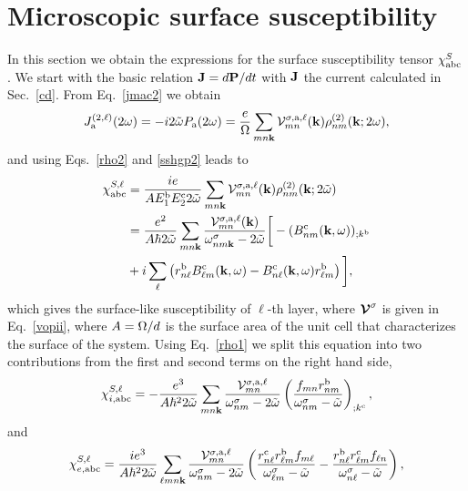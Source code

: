 \documentclass[floatfix,prb,aps,superscriptaddress,11pt,preprint,letterpaper]{revtex4}
\begin{document}


\section{Microscopic surface susceptibility}
In this section we obtain the expressions for the 
surface susceptibility tensor $\chi^S_{\mathrm{a}\mathrm{b}\mathrm{c}}$.
We start with the basic relation $\mathbf{J}=d\mathbf{P}/dt$ 
with $\mathbf{J}$ the current calculated in Sec.~\ref{cd}. From Eq.~\eqref{jmac2} 
we obtain
\begin{equation}\label{Pjikn}
J_{\mathrm{a}}^{(2,\ell)}(2\omega)=-i2\tilde\omega P_{\mathrm{a}}(2\omega)
=\frac{e}{\Omega}
\sum_{mn\mathbf{k}}
{\mathbf{\cal V}}^{\sigma,\mathrm{a},\ell}_{mn}(\mathbf{k})
\rho^{(2)}_{nm}(\mathbf{k};2\omega)
,
\end{equation}
and using Eqs.~\eqref{rho2} and \eqref{sshgp2} leads to
\begin{align}\label{Pjikn2}
\chi^{S,\ell}_{\mathrm{a}\mathrm{b}\mathrm{c}}
&=
\frac{ie}{A E^{\mathrm{b}}_1E^{\mathrm{c}}_2 2\tilde\omega}
\sum_{mn\mathbf{k}}
{\mathbf{\cal V}}^{\sigma,\mathrm{a},\ell}_{mn}(\mathbf{k})
\rho^{(2)}_{nm}(\mathbf{k};2\tilde\omega)
\nonumber \\
&=
\frac{e^2}{A\hbar2\tilde\omega}
\sum_{mn\mathbf{k}}
\frac{{\mathbf{\cal V}}^{\sigma,\mathrm{a},\ell}_{mn}(\mathbf{k})}
{\omega^\sigma_{nm\mathbf{k}}-2\tilde\omega}
\bigg[
-(B_{nm}^{\mathrm{c}}(\mathbf{k},\omega))_{;k^{\mathrm{b}}}
\nonumber \\
&
+i\sum_\ell\left(r_{n\ell}^{\mathrm{b}}B_{\ell m}^{\mathrm{c}}(\mathbf{k},\omega) -
  B_{n\ell}^{\mathrm{c}}(\mathbf{k},\omega) 
  r_{\ell m}^{\mathrm{b}}\right)
\bigg]
,
\end{align}
which gives the surface-like susceptibility of $\ell$-th layer, where 
$\boldsymbol{\mathcal{\cal V}}^\sigma$ is given in Eq.~\eqref{vopii},
where $A=\Omega/d$ is the surface area of the unit
cell that characterizes the surface of the system.
Using Eq.~\eqref{rho1} we
split this equation into
two contributions from the first and second terms on the right hand side,
\begin{equation}\label{chii}
\chi_{i,\mathrm{a}\mathrm{b}\mathrm{c}}^{S,\ell}
=-\frac{e^3}{A\hbar^22\tilde\omega}\sum_{mn\mathbf{k}}
\frac{{\mathbf{\cal V}}_{mn}^{\sigma,\mathrm{a},\ell}}{\omega^\sigma_{nm}-2\tilde\omega}
\left(\frac{f_{mn}r_{nm}^{\mathrm{b}}}{\omega^\sigma_{nm}-\tilde\omega}\right)_{;k^{\mathrm{c}}},
\end{equation} 
and 
\begin{equation}\label{chie}
\chi_{e,\mathrm{a}\mathrm{b}\mathrm{c}}^{S,\ell}
=\frac{ie^3}{A\hbar^22\tilde\omega}\sum_{\ell mn\mathbf{k}}
\frac{{\mathbf{\cal V}}_{mn}^{\sigma,\mathrm{a},\ell}}{\omega^\sigma_{nm}-2\tilde\omega}
\left(
\frac{r_{n\ell}^{\mathrm{c}} r_{\ell m}^{\mathrm{b}} 
f_{m\ell}}{\omega^\sigma_{\ell m}-\tilde\omega}
-\frac{r_{n\ell}^{\mathrm{b}} r_{\ell m}^{\mathrm{c}} 
f_{\ell n}}{\omega^\sigma_{n \ell}-\tilde\omega}
\right),
\end{equation} 
\end{document}
